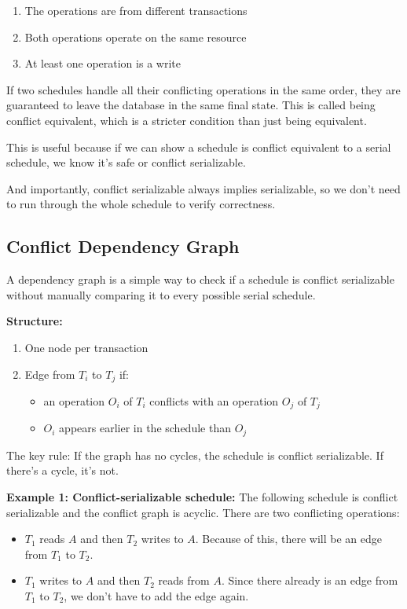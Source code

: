 \documentclass{article}
\begin{document}
\begin{enumerate}
    \item The operations are from different transactions
    \item Both operations operate on the same resource
    \item At least one operation is a write
\end{enumerate}

If two schedules handle all their conflicting operations in the same order, they are guaranteed to leave the database in the same final state. This is called being conflict equivalent, which is a stricter condition than just being equivalent.

This is useful because if we can show a schedule is conflict equivalent to a serial schedule, we know it's safe or conflict serializable.

And importantly, conflict serializable always implies serializable, so we don't need to run through the whole schedule to verify correctness.

\subsection{Conflict Dependency Graph}

A dependency graph is a simple way to check if a schedule is conflict serializable without manually comparing it to every possible serial schedule.

\textbf{Structure:}
\begin{enumerate}
    \item One node per transaction
    \item Edge from $T_i$ to $T_j$ if:
    \begin{itemize}
        \item an operation $O_i$ of $T_i$ conflicts with an operation $O_j$ of $T_j$
        \item $O_i$ appears earlier in the schedule than $O_j$
    \end{itemize}
\end{enumerate}

The key rule: If the graph has no cycles, the schedule is conflict serializable. If there's a cycle, it's not.

\textbf{Example 1: Conflict-serializable schedule:} The following schedule is conflict serializable and the conflict graph is acyclic. There are two conflicting operations:
\begin{itemize}
    \item $T_1$ reads $A$ and then $T_2$ writes to $A$. Because of this, there will be an edge from $T_1$ to $T_2$.
    \item $T_1$ writes to $A$ and then $T_2$ reads from $A$. Since there already is an edge from $T_1$ to $T_2$, we don’t have to add the edge again.
\end{itemize}
\end{document}
